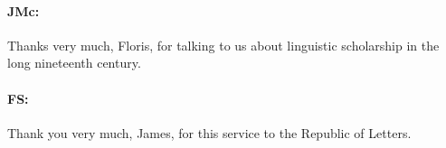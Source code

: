 \documentclass[output=paper]{langscibook}
\begin{document}
\paragraph*{JMc:}  Thanks very much, Floris, for talking to us about linguistic scholarship in the long nineteenth century.


\paragraph*{FS:}  Thank you very much, James, for this service to the Republic of Letters.


\nocite{adelung1806a}
\nocite{balbi1826a}
\nocite{bleek1858a}
\nocite{boas1940a}
\nocite{ponceau1838a}
\nocite{grierson1903a}
\nocite{haeckel1868a}
\nocite{herv1787a}
\nocite{herv1787b}
\nocite{humboldt1836a}
\nocite{humboldt1988a}
\nocite{klaproth1823a}
\nocite{koelle1854a}
\nocite{lepsius1854a}
\nocite{lepsius1863a}
\nocite{marsden1782a}
\nocite{marsden1827a}
\nocite{mueller1876a}
\nocite{raffles1830a}
\nocite{schlegel1808a}
\nocite{schlegel1900a}
\nocite{schmidt1919a}
\nocite{schmidt1926a}
\nocite{schmidt1927a}
\nocite{alter1999a}
\nocite{daston2006a}
\nocite{marchand2003a}
\nocite{mcneely2020a}
\nocite{majeed2018a}
\nocite{messling2016a}
\nocite{shapin1996a}
\nocite{solleveld2016a}
\nocite{solleveld2019a}
\nocite{solleveld2020a}
\nocite{solleveld2020b}
\nocite{solleveld2020c}
\nocite{solleveld2020d}
\nocite{solleveld2020e}


\sloppy
\PrintPrimarySources{}
\PrintSecondarySources{}
\end{document}
